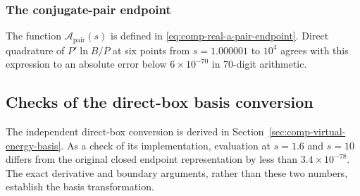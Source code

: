 \subsubsection{The conjugate-pair endpoint}
The function $\mathcal A_{\mathrm{pair}}(s)$ is defined in
\eqref{eq:comp-real-a-pair-endpoint}. Direct quadrature of $P'\ln B/P$ at six points from
$s=1.000001$ to $10^4$ agrees with this expression to an absolute
error below $6\times10^{-70}$ in 70-digit arithmetic.

\subsection{Checks of the direct-box basis conversion}
The independent direct-box conversion is derived in
Section~\ref{sec:comp-virtual-energy-basis}. As a check
of its implementation, evaluation at $s=1.6$ and $s=10$ differs from the
original closed endpoint representation by less than
$3.4\times10^{-78}$.  The exact derivative and boundary arguments,
rather than these two numbers, establish the basis transformation.
